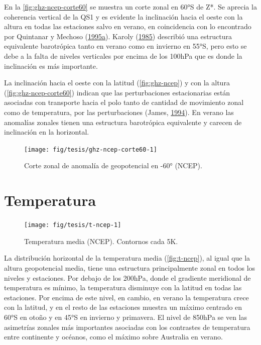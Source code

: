 \documentclass[spanish,a4paper,12pt,oneside]{book}
\begin{document}
En la \autoref{fig:ghz-ncep-corte60} se muestra un corte zonal en 60°S
de Z*. Se aprecia la coherencia vertical de la QS1 y es evidente la
inclinación hacia el oeste con la altura en todas las estaciones salvo
en verano, en coincidencia con lo encontrado por Quintanar y Mechoso
(\protect\hyperlink{ref-Quintanar1995a}{1995}\protect\hyperlink{ref-Quintanar1995a}{a}).
Karoly (\protect\hyperlink{ref-Karoly1985}{1985}) describió una
estructura equivalente barotrópica tanto en verano como en invierno en
55°S, pero esto se debe a la falta de niveles verticales por encima de
los 100hPa que es donde la inclinación es más importante.

La inclinación hacia el oeste con la latitud (\autoref{fig:ghz-ncep}) y
con la altura (\autoref{fig:ghz-ncep-corte60}) indican que las
perturbaciones estacionarias están asociadas con transporte hacia el
polo tanto de cantidad de movimiento zonal como de temperatura, por las
perturbaciones (James, \protect\hyperlink{ref-James}{1994}). En verano
las anomalías zonales tienen una estructura barotrópica equivalente y
carecen de inclinación en la horizontal.

\begin{figure}
\texttt{[image: fig/tesis/ghz-ncep-corte60-1]} \caption{Corte zonal de anomalía de geopotencial en -60° (NCEP).}\label{fig:ghz-ncep-corte60}
\end{figure}

\section{Temperatura}\label{temperatura}

\begin{landscape}\begin{figure}

{\centering \texttt{[image: fig/tesis/t-ncep-1]} 

}

\caption{Temperatura media (NCEP). Contornos cada 5K.}\label{fig:t-ncep}
\end{figure}
\end{landscape}

La distribución horizontal de la temperatura media
(\autoref{fig:t-ncep}), al igual que la altura geopotencial media, tiene
una estructura principalmente zonal en todos los niveles y estaciones.
Por debajo de los 200hPa, donde el gradiente meridional de temperatura
es mínimo, la temperatura disminuye con la latitud en todas las
estaciones. Por encima de este nivel, en cambio, en verano la
temperatura crece con la latitud, y en el resto de las estaciones
muestra un máximo centrado en 60°S en otoño y en 45°S en invierno y
primavera. El nivel de 850hPa se ven las asimetrías zonales más
importantes asociadas con los contrastes de temperatura entre continente
y océanos, como el máximo sobre Australia en verano.
\end{document}
